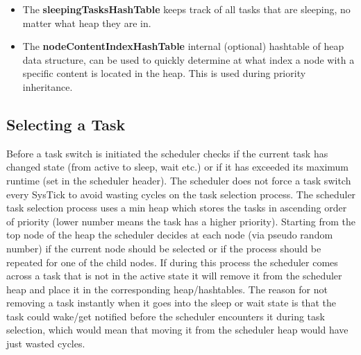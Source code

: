 \documentclass[12pt,a4paper]{article}
\begin{document}
\begin{itemize}
  \item The  \textbf{sleepingTasksHashTable} keeps track of all tasks that are sleeping, no matter what heap they are in.
  \item The  \textbf{nodeContentIndexHashTable} internal (optional) hashtable of heap data structure, can be used to quickly determine at what index a node with a specific content is located in the heap. This is used during priority inheritance.
\end{itemize}




\subsection{Selecting a Task}
Before a task switch is initiated the scheduler checks if the current task has changed state (from active to sleep, wait etc.) or if it has exceeded its maximum runtime (set in the scheduler header). The scheduler does not force a task switch every SysTick to avoid wasting cycles on the task selection process. The scheduler task selection process uses a min heap which stores the tasks in ascending order of priority (lower number means the task has a higher priority). Starting from the top node of the heap the scheduler decides at each node (via pseudo random number) if the current node should be selected or if the process should be repeated for one of the child nodes. If during this process the scheduler comes across a task that is not in the active state it will remove it from the scheduler heap and place it in the corresponding heap/hashtables. The reason for not removing a task instantly when it goes into the sleep or wait state is that the task could wake/get notified before the scheduler encounters it during task selection, which would mean that moving it from the scheduler heap would have just wasted cycles.\\
\end{document}
